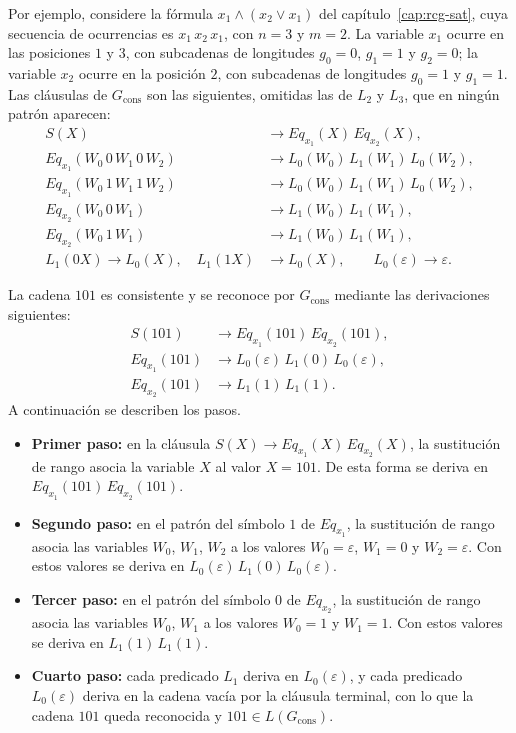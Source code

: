 \documentclass{report}
\theoremstyle{definition}
\theoremstyle{plain}
\theoremstyle{remark}
\begin{document}
Por ejemplo, considere la fórmula $x_1 \wedge (x_2 \vee x_1)$ del
capítulo~\ref{cap:rcg-sat}, cuya secuencia de ocurrencias es
$x_1\,x_2\,x_1$, con $n=3$ y $m=2$. La variable $x_1$ ocurre en las
posiciones $1$ y $3$, con subcadenas de longitudes $g_0=0$, $g_1=1$ y
$g_2=0$; la variable $x_2$ ocurre en la posición $2$, con subcadenas
de longitudes $g_0=1$ y $g_1=1$. Las cláusulas de $G_{\mathrm{cons}}$
son las siguientes, omitidas las de $L_2$ y $L_3$, que en ningún
patrón aparecen:
\[
  \begin{aligned}
    S(X)                              & \to Eq_{x_1}(X)\, Eq_{x_2}(X),      \\
    Eq_{x_1}(W_0\,0\,W_1\,0\,W_2)     & \to L_0(W_0)\, L_1(W_1)\, L_0(W_2), \\
    Eq_{x_1}(W_0\,1\,W_1\,1\,W_2)     & \to L_0(W_0)\, L_1(W_1)\, L_0(W_2), \\
    Eq_{x_2}(W_0\,0\,W_1)             & \to L_1(W_0)\, L_1(W_1),            \\
    Eq_{x_2}(W_0\,1\,W_1)             & \to L_1(W_0)\, L_1(W_1),            \\
    L_1(0X) \to L_0(X), \quad L_1(1X) & \to L_0(X), \qquad
    L_0(\varepsilon) \to \varepsilon.
  \end{aligned}
\]

La cadena $101$ es consistente y se reconoce por $G_{\mathrm{cons}}$
mediante las derivaciones siguientes:
\[
  \begin{aligned}
    S(101)        & \to Eq_{x_1}(101)\, Eq_{x_2}(101),                \\
    Eq_{x_1}(101) & \to L_0(\varepsilon)\, L_1(0)\, L_0(\varepsilon), \\
    Eq_{x_2}(101) & \to L_1(1)\, L_1(1).
  \end{aligned}
\]
A continuación se describen los pasos.
\begin{itemize}
  \item \textbf{Primer paso:} en la cláusula
        $S(X) \to Eq_{x_1}(X)\, Eq_{x_2}(X)$, la sustitución de rango
        asocia la variable $X$ al valor $X = 101$. De esta forma se deriva
        en $Eq_{x_1}(101)\, Eq_{x_2}(101)$.
  \item \textbf{Segundo paso:} en el patrón del símbolo $1$ de
        $Eq_{x_1}$, la sustitución de rango asocia las variables $W_0$,
        $W_1$, $W_2$ a los valores $W_0 = \varepsilon$, $W_1 = 0$ y
        $W_2 = \varepsilon$. Con estos valores se deriva en
        $L_0(\varepsilon)\, L_1(0)\, L_0(\varepsilon)$.
  \item \textbf{Tercer paso:} en el patrón del símbolo $0$ de
        $Eq_{x_2}$, la sustitución de rango asocia las variables $W_0$,
        $W_1$ a los valores $W_0 = 1$ y $W_1 = 1$. Con estos valores se
        deriva en $L_1(1)\, L_1(1)$.
  \item \textbf{Cuarto paso:} cada predicado $L_1$ deriva en
        $L_0(\varepsilon)$, y cada predicado $L_0(\varepsilon)$ deriva en
        la cadena vacía por la cláusula terminal, con lo que la cadena
        $101$ queda reconocida y $101 \in L(G_{\mathrm{cons}})$.
\end{itemize}
\end{document}
